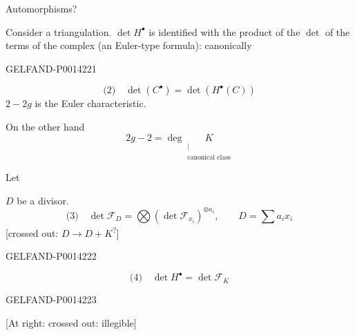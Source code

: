 Automorphisms?

Consider a triangulation. \(\det H^\bullet\) is identified with the product of the \(\det\)
of the terms of the complex (an Euler-type formula): canonically


\begin{GelfandAdjacentEvidence}{GELFAND-P001422}{1}

\[
\text{(2)}\quad\det(C^\bullet)=\det(H^\bullet(C))
\]
\(2-2g\) is the Euler characteristic.

On the other hand
\[
2g-2=\deg\underset{\substack{|\\\text{canonical class}}}{K}
\]

Let

\(D\) be a divisor.
\[
\text{(3)}\quad
\det\mathcal F_D=\bigotimes(\det\mathcal F_{x_i})^{\otimes a_i},
\qquad D=\sum a_i x_i
\]
[crossed out: \(D\longrightarrow D+K\)\textsuperscript{?}]
\end{GelfandAdjacentEvidence}
\begin{GelfandAdjacentEvidence}{GELFAND-P001422}{2}


\[
\text{(4)}\quad\det H^\bullet=\det\mathcal F_K
\]
\end{GelfandAdjacentEvidence}
\begin{GelfandAdjacentEvidence}{GELFAND-P001422}{3}

[At right: crossed out: illegible]
\end{GelfandAdjacentEvidence}

